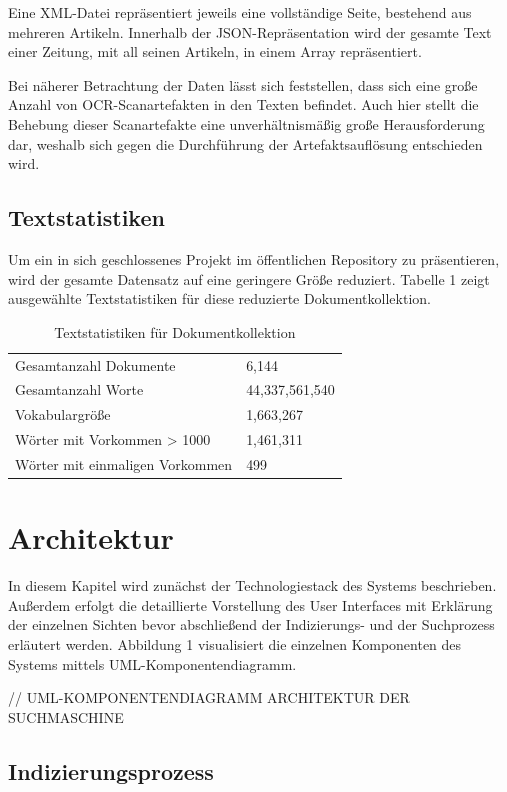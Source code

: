 \documentclass[11pt,a4paper, halfparskip]{scrartcl}
\begin{document}
Eine XML-Datei repräsentiert jeweils eine vollständige Seite, bestehend aus mehreren Artikeln.
Innerhalb der JSON-Repräsentation wird der gesamte Text einer Zeitung, mit all seinen Artikeln, in einem Array repräsentiert.


Bei näherer Betrachtung der Daten lässt sich feststellen, dass sich eine große Anzahl von OCR-Scanartefakten in den Texten befindet.
Auch hier stellt die Behebung dieser Scanartefakte eine unverhältnismäßig große Herausforderung dar, weshalb sich gegen die Durchführung der Artefaktsauflösung entschieden wird. 

\subsection{Textstatistiken}
Um ein in sich geschlossenes Projekt im öffentlichen Repository zu präsentieren, wird der gesamte Datensatz auf eine geringere Größe reduziert.
Tabelle 1 zeigt ausgewählte Textstatistiken für diese reduzierte Dokumentkollektion.

\begin{table}[h!]
	\centering
	\begin{tabularx}{0.8\textwidth}{lX}
		\hline
		Gesamtanzahl Dokumente & 6,144\\
		Gesamtanzahl Worte & 44,337,561,540 \\
		Vokabulargröße & 1,663,267 \\
		Wörter mit Vorkommen > 1000 & 1,461,311 \\
		Wörter mit einmaligen Vorkommen & 499 \\
		\hline
	\end{tabularx}
	\caption{Textstatistiken für Dokumentkollektion}
\end{table}

\section{Architektur}

In diesem Kapitel wird zunächst der Technologiestack des Systems beschrieben. 
Außerdem erfolgt die detaillierte Vorstellung des User Interfaces mit Erklärung der einzelnen Sichten bevor abschließend der Indizierungs- und der Suchprozess erläutert werden.
Abbildung 1 visualisiert die einzelnen Komponenten des Systems mittels UML-Komponentendiagramm. 

// UML-KOMPONENTENDIAGRAMM ARCHITEKTUR DER SUCHMASCHINE 

\subsection{Indizierungsprozess}
\end{document}
